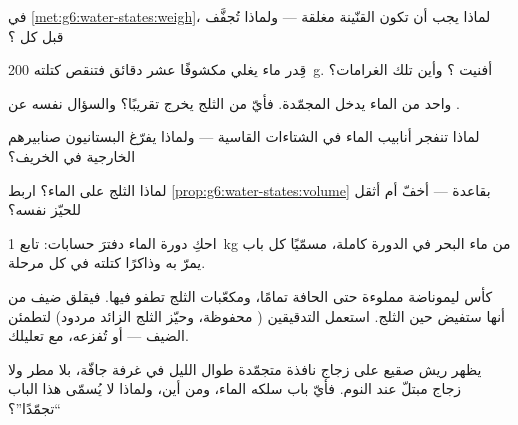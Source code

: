 \begin{exercise}[$\star$]\label{exo:g6:water-states:4}
في \cref{met:g6:water-states:weigh}، لماذا يجب أن تكون القنّينة
مغلقة --- ولماذا تُجفَّف قبل كل ؟
\end{exercise}

\begin{exercise}[$\star$]\label{exo:g6:water-states:5}
قِدر ماء يغلي مكشوفًا عشر دقائق فتنقص كتلته \qty{200}{g}. أفنيت
؟ وأين تلك الغرامات؟
\end{exercise}

\begin{exercise}[$\star$]\label{exo:g6:water-states:6}
 واحد من الماء يدخل المجمّدة. فأيّ  من الثلج يخرج
تقريبًا؟ والسؤال نفسه عن .
\end{exercise}

\begin{exercise}[$\star$]\label{exo:g6:water-states:7}
لماذا تنفجر أنابيب الماء في الشتاءات القاسية --- ولماذا يفرّغ
البستانيون صنابيرهم الخارجية في الخريف؟
\end{exercise}

\begin{exercise}[$\star$]\label{exo:g6:water-states:8}
لماذا  الثلج على الماء؟ اربط
\cref{prop:g6:water-states:volume} بقاعدة  --- أخفّ أم
أثقل للحيّز نفسه؟
\end{exercise}

\begin{exercise}[$\star\star$]\label{exo:g6:water-states:9}
احكِ دورة الماء دفترَ حسابات: تابع \qty{1}{kg} من ماء البحر في
الدورة كاملة، مسمّيًا كل باب يمرّ به وذاكرًا كتلته في كل
مرحلة.
\end{exercise}

\begin{exercise}[$\star\star$]\label{exo:g6:water-states:10}
كأس ليموناضة مملوءة حتى الحافة تمامًا، ومكعّبات الثلج تطفو
فيها. فيقلق ضيف من أنها ستفيض حين  الثلج. استعمل
التدقيقين ( محفوظة، وحيّز الثلج الزائد مردود) لتطمئن
الضيف --- أو تُفزعه، مع تعليلك.
\end{exercise}

\begin{exercise}[$\star\star$]\label{exo:g6:water-states:11}
يظهر ريش صقيع على زجاج نافذة متجمّدة طوال الليل في غرفة جافّة،
بلا مطر ولا زجاج مبتلّ عند النوم. فأيّ باب سلكه الماء، ومن أين،
ولماذا لا يُسمّى هذا الباب ``تجمّدًا''؟
\end{exercise}

